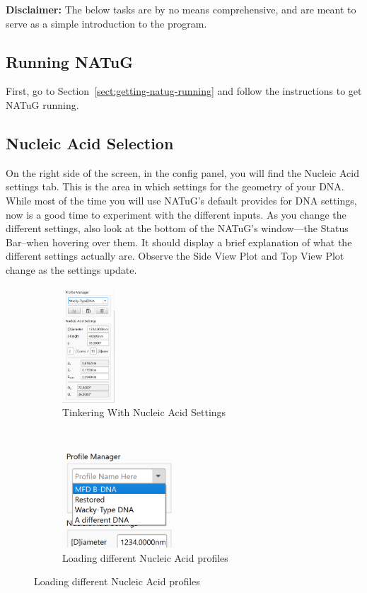 \documentclass[titlepage]{article}
\begin{document}
	\textbf{Disclaimer:} The below tasks are by no means comprehensive, and are meant to serve as a simple introduction to the program.
	
	\subsection{Running NATuG}
	First, go to Section~\ref{sect:getting-natug-running} and follow the instructions to get NATuG running.
	
	\subsection{Nucleic Acid Selection}
	
	On the right side of the screen, in the config panel, you will find the Nucleic Acid settings tab. This is the area in which settings for the geometry of your DNA. While most of the time you will use NATuG's default provides for DNA settings, now is a good time to experiment with the different inputs. As you change the different settings, also look at the bottom of the NATuG's window---the Status Bar--when hovering over them. It should display a brief explanation of what the different settings actually are. Observe the Side View Plot and Top View Plot change as the settings update.
	
	\begin{figure}[h]
		\caption{Experimenting with Nucleic Acid settings}
		\centering
		\begin{subfigure}{.5\textwidth}
			\centering
			\includegraphics[height=1.7in]{nucleic-acid-tinkering.png}
			\caption{Tinkering With Nucleic Acid Settings}
		\end{subfigure}%
		~
		\begin{subfigure}{.5\textwidth}
			\centering
			\includegraphics[width=1.7in]{nucleic-acid-tinkering-2.png}
			\caption{Loading different Nucleic Acid profiles}
		\end{subfigure}
	\end{figure}
		
\end{document}
